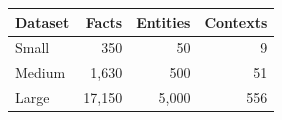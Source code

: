 \begin{tabular}{@{}lrrr@{}}
\toprule
Dataset & Facts & Entities & Contexts \\
\midrule
Small    & 350   & 50  & 9 \\
Medium   & 1,630 & 500 & 51 \\
Large    & 17,150& 5,000 & 556 \\
\bottomrule
\end{tabular}

